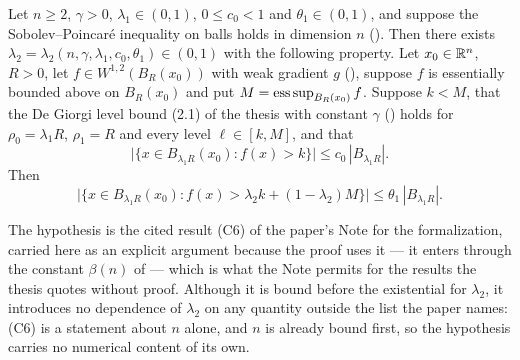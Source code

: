 \begin{lemma}[Lemma 2.4]
Let $n\ge2$, $\gamma>0$, $\lambda_1\in(0,1)$, $0\le c_0<1$ and
$\theta_1\in(0,1)$, and suppose the Sobolev--Poincar\'e inequality on balls holds in dimension $n$
().  Then there exists
$\lambda_2=\lambda_2(n,\gamma,\lambda_1,c_0,\theta_1)\in(0,1)$ with the following
property.  Let $x_0\in\mathbb{R}^n$, $R>0$, let $f\in W^{1,2}(B_R(x_0))$ with weak
gradient $g$ (), suppose $f$ is essentially bounded above on
$B_R(x_0)$ and put $M=\operatorname*{ess\,sup}_{B_R(x_0)}f$.  Suppose $k<M$, that the De Giorgi
level bound (2.1) of the thesis with constant $\gamma$
() holds for $\rho_0=\lambda_1R$, $\rho_1=R$ and
every level $\ell\in[k,M]$, and that
\[
\bigl|\{x\in B_{\lambda_1R}(x_0):f(x)>k\}\bigr|\le c_0\,|B_{\lambda_1R}| .
\]
Then
\[
\bigl|\{x\in B_{\lambda_1R}(x_0):f(x)>\lambda_2k+(1-\lambda_2)M\}\bigr|
\le\theta_1\,|B_{\lambda_1R}| .
\]

The hypothesis  is the cited result (C6) of the
paper's Note for the formalization, carried here as an explicit argument because
the proof uses it --- it enters through the constant $\beta(n)$ of  --- which is what the
Note permits for the results the thesis quotes without proof.  Although it is
bound before the existential for $\lambda_2$, it introduces no dependence of
$\lambda_2$ on any quantity outside the list the paper names: (C6) is a statement
about $n$ alone, and $n$ is already bound first, so the hypothesis carries no
numerical content of its own.
\end{lemma}
